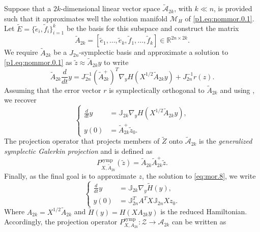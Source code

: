 Suppose that a $2k$-dimensional linear vector space $\tilde{ \mathcal A}_{2k}$, with $k\ll n$, is provided such that it approximates well the solution manifold $\mathcal M_H$ of \eqref{p1.eq:nommor.0.1}. Let $\tilde E = \{ \tilde e_i,\tilde f_i \}_{i=1}^k$ be the basis for this subspace and construct the matrix
\begin{equation} \label{p1.eq:nommor.0.7}
	\tilde A_{2k} = [\tilde e_1,\dots,\tilde e_k,\tilde f_1,\dots,\tilde f_k] \in \mathbb R^{2n\times 2k}.
\end{equation}
We require $\tilde A_{2k}$ be a $J_{2n}$-symplectic basis and approximate a solution to \eqref{p1.eq:nommor.0.1} as $\tilde z \approx \tilde A_{2k} y$ to write
\begin{equation} \label{p1.eq:nommor.0.8}
	\tilde A_{2k} \frac d {dt} y = J^{-1}_{2n} (\tilde A_{2k}^+)^T \nabla_{y} H(X^{1/2}\tilde A_{2k}y) + J^{-1}_{2n} r(z).
\end{equation}
Assuming that the error vector $r$ is symplectically orthogonal to $\tilde A_{2k}$ and using , we recover
\begin{equation}
	\left\{
	\begin{aligned}
		\frac d {dt} y &= \mathbb J_{2k} \nabla_{y} H(X^{1/2}\tilde A_{2k} y), \\
		y(0) &= \tilde A_{2k}^+ \tilde z_0.
	\end{aligned}
	\right.	
\end{equation}
The projection operator that projects members of $\tilde Z$ onto $\tilde {\mathcal A}_{2k}$ is the \emph{generalized symplectic Galerkin projection} and is defined as
\begin{equation} \label{p1.eq:nommor.0.9}
	P_{X,\tilde A_{2k}}^{\text{symp}}(\tilde z) = \tilde A_{2k} \tilde A_{2k}^+ \tilde z.
\end{equation}
Finally, as the final goal is to approximate $z$, the solution to \eqref{eq:mor.8}, we write
\begin{equation} \label{p1.eq:nommor.0.10}
	\left\{
	\begin{aligned}
		\frac{d}{dt} y &= \mathbb J_{2k} \nabla_y \tilde H(y), \\
		y(0) &= \mathbb J_{2n}^T A^T X \mathbb J_{2n} X z_0.
	\end{aligned}
	\right.	
\end{equation}
Where $A_{2k} = X^{1/2} \tilde A_{2k}$ and $\tilde H(y) = H(XA_{2k}y)$ is the reduced Hamiltonian. Accordingly, the projection operator $P_{X,A_{2k}}^\text{symp}:\mathcal Z\to \mathcal A_{2k}$ can be written as
